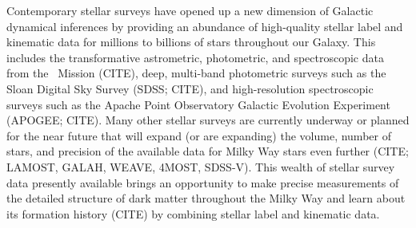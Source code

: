 
Contemporary stellar surveys have opened up a new dimension of Galactic dynamical
inferences by providing an abundance of high-quality stellar label and kinematic data
for millions to billions of stars throughout our Galaxy.
This includes the transformative astrometric, photometric, and spectroscopic data from
the \gaia\ Mission (CITE), deep, multi-band photometric surveys such as the Sloan
Digital Sky Survey (SDSS; CITE), and high-resolution spectroscopic surveys such as the
Apache Point Observatory Galactic Evolution Experiment (APOGEE; CITE).
Many other stellar surveys are currently underway or planned for the near future that
will expand (or are expanding) the volume, number of stars, and precision of the
available data for Milky Way stars even further (CITE; LAMOST, GALAH, WEAVE, 4MOST,
SDSS-V).
This wealth of stellar survey data presently available brings an opportunity to make
precise measurements of the detailed structure of dark matter throughout the Milky Way
and learn about its formation history (CITE) by combining stellar label and kinematic
data.

